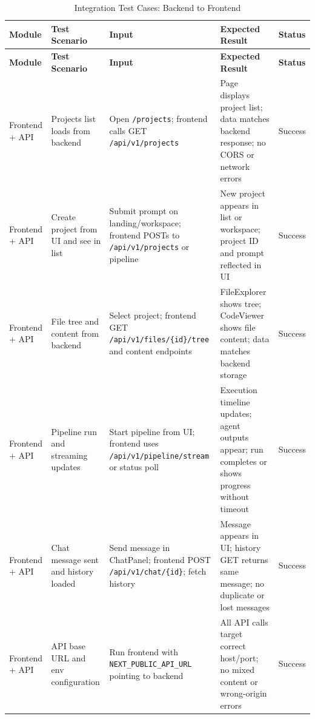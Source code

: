 \renewcommand{\arraystretch}{1.2}
\begin{longtable}{|p{2.8cm}|p{3.4cm}|p{3.4cm}|p{4.2cm}|>{\centering\arraybackslash}p{1.6cm}|}
\caption{Integration Test Cases: Backend to Frontend}
\label{tab:integration_backend_frontend}
\\
\hline
\textbf{Module} & \textbf{Test Scenario} & \textbf{Input} & \textbf{Expected Result} & \textbf{Status} \\
\hline
\endfirsthead
\hline
\textbf{Module} & \textbf{Test Scenario} & \textbf{Input} & \textbf{Expected Result} & \textbf{Status} \\
\hline
\endhead
\hline
\endfoot
\hline
\endlastfoot
Frontend + API & Projects list loads from backend & Open \texttt{/\allowbreak{}projects}; frontend calls GET \texttt{/\allowbreak{}api/\allowbreak{}v1/\allowbreak{}projects} & Page displays project list; data matches backend response; no CORS or network errors & Success \\
\hline
Frontend + API & Create project from UI and see in list & Submit prompt on landing/workspace; frontend POSTs to \texttt{/\allowbreak{}api/\allowbreak{}v1/\allowbreak{}projects} or pipeline & New project appears in list or workspace; project ID and prompt reflected in UI & Success \\
\hline
Frontend + API & File tree and content from backend & Select project; frontend GET \texttt{/\allowbreak{}api/\allowbreak{}v1/\allowbreak{}files/\allowbreak{}\{id\}/tree} and content endpoints & FileExplorer shows tree; CodeViewer shows file content; data matches backend storage & Success \\
\hline
Frontend + API & Pipeline run and streaming updates & Start pipeline from UI; frontend uses \texttt{/\allowbreak{}api/\allowbreak{}v1/\allowbreak{}pipeline/\allowbreak{}stream} or status poll & Execution timeline updates; agent outputs appear; run completes or shows progress without timeout & Success \\
\hline
Frontend + API & Chat message sent and history loaded & Send message in ChatPanel; frontend POST \texttt{/\allowbreak{}api/\allowbreak{}v1/\allowbreak{}chat/\allowbreak{}\{id\}}; fetch history & Message appears in UI; history GET returns same message; no duplicate or lost messages & Success \\
\hline
Frontend + API & API base URL and env configuration & Run frontend with \texttt{NEXT\_\allowbreak{}PUBLIC\_\allowbreak{}API\_\allowbreak{}URL} pointing to backend & All API calls target correct host/port; no mixed content or wrong-origin errors & Success \\
\hline
\end{longtable}


